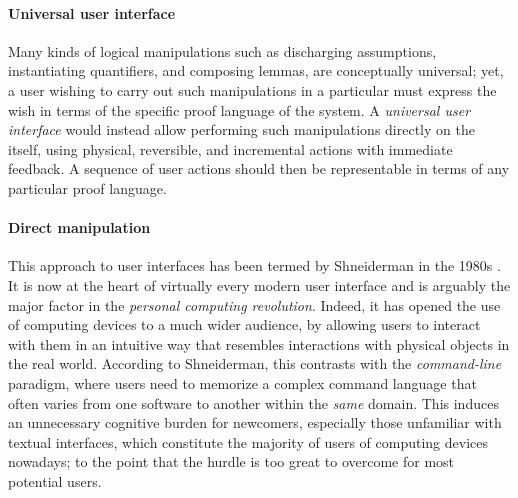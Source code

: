 

\paragraph{Universal user interface}

Many kinds of logical manipulations such as discharging assumptions,
instantiating quantifiers, and composing lemmas, are conceptually universal;
yet, a user wishing to carry out such manipulations in a particular  must express the wish in terms of the specific proof language of the
system. A \emph{universal user interface} would instead allow performing such
manipulations directly on the \emph{} itself, using physical,
reversible, and incremental actions with immediate feedback. A sequence of user
actions should then be representable in terms of any particular proof language.

\paragraph{Direct manipulation}

\AP
This approach to user interfaces has been termed  by
Shneiderman in the 1980s . It is now at the
heart of virtually every modern user interface and is arguably the major factor
in the \emph{personal computing revolution}. Indeed, it has opened the use of
computing devices to a much wider audience, by allowing users to interact with
them in an intuitive way that resembles interactions with physical objects in
the real world. According to Shneiderman, this contrasts with the
\emph{command-line} paradigm, where users need to memorize a complex command
language that often varies from one software to another within the \emph{same}
domain. This induces an unnecessary cognitive burden for newcomers, especially
those unfamiliar with textual interfaces, which constitute the majority of users
of computing devices nowadays; to the point that the hurdle is too great to
overcome for most potential users.

